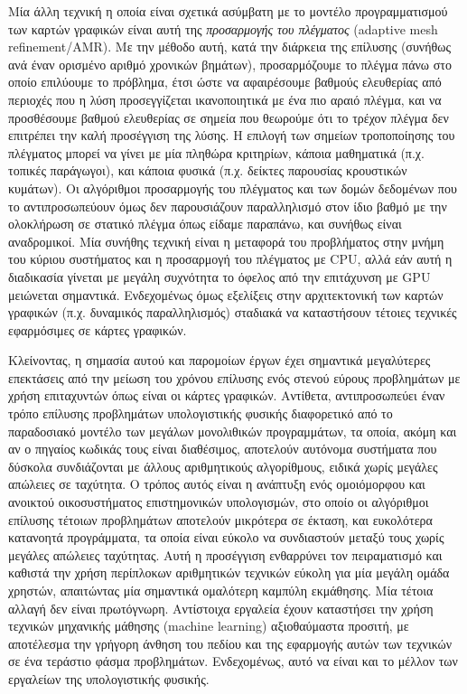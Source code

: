 Μία άλλη τεχνική η οποία είναι σχετικά ασύμβατη με το μοντέλο προγραμματισμού των καρτών γραφικών είναι αυτή της \emph{προσαρμογής του πλέγματος} (adaptive mesh refinement/AMR).
Με την μέθοδο αυτή, κατά την διάρκεια της επίλυσης (συνήθως ανά έναν ορισμένο αριθμό χρονικών βημάτων), προσαρμόζουμε το πλέγμα πάνω στο οποίο επιλύουμε το πρόβλημα, έτσι ώστε να αφαιρέσουμε βαθμούς ελευθερίας από περιοχές που η λύση προσεγγίζεται ικανοποιητικά με ένα πιο αραιό πλέγμα, και να προσθέσουμε βαθμού ελευθερίας σε σημεία που θεωρούμε ότι το τρέχον πλέγμα δεν επιτρέπει την καλή προσέγγιση της λύσης.
Η επιλογή των σημείων τροποποίησης του πλέγματος μπορεί να γίνει με μία πληθώρα κριτηρίων, κάποια μαθηματικά (π.χ. τοπικές παράγωγοι), και κάποια φυσικά (π.χ. δείκτες παρουσίας κρουστικών κυμάτων).
Οι αλγόριθμοι προσαρμογής του πλέγματος και των δομών δεδομένων που το αντιπροσωπεύουν όμως δεν παρουσιάζουν παραλληλισμό στον ίδιο βαθμό με την ολοκλήρωση σε στατικό πλέγμα όπως είδαμε παραπάνω, και συνήθως είναι αναδρομικοί.
Μία συνήθης τεχνική είναι η μεταφορά του προβλήματος στην μνήμη του κύριου συστήματος και η προσαρμογή του πλέγματος με CPU, αλλά εάν αυτή η διαδικασία γίνεται με μεγάλη συχνότητα το όφελος από την επιτάχυνση με GPU μειώνεται σημαντικά.
Ενδεχομένως όμως εξελίξεις στην αρχιτεκτονική των καρτών γραφικών (π.χ. δυναμικός παραλληλισμός) σταδιακά να καταστήσουν τέτοιες τεχνικές εφαρμόσιμες σε κάρτες γραφικών.

Κλείνοντας, η σημασία αυτού και παρομοίων έργων έχει σημαντικά μεγαλύτερες επεκτάσεις από την μείωση του χρόνου επίλυσης ενός στενού εύρους προβλημάτων με χρήση επιταχυντών όπως είναι οι κάρτες γραφικών.
Αντίθετα, αντιπροσωπεύει έναν τρόπο επίλυσης προβλημάτων υπολογιστικής φυσικής διαφορετικό από το παραδοσιακό μοντέλο των μεγάλων μονολιθικών προγραμμάτων, τα οποία, ακόμη και αν ο πηγαίος κωδικάς τους είναι διαθέσιμος, αποτελούν αυτόνομα συστήματα που δύσκολα συνδιάζονται με άλλους αριθμητικούς αλγορίθμους, ειδικά χωρίς μεγάλες απώλειες σε ταχύτητα.
Ο τρόπος αυτός είναι η ανάπτυξη ενός ομοιόμορφου και ανοικτού οικοσυστήματος επιστημονικών υπολογισμών, στο οποίο οι αλγόριθμοι επίλυσης τέτοιων προβλημάτων αποτελούν μικρότερα σε έκταση, και ευκολότερα κατανοητά προγράμματα, τα οποία είναι εύκολο να συνδιαστούν μεταξύ τους χωρίς μεγάλες απώλειες ταχύτητας.
Αυτή η προσέγγιση ενθαρρύνει τον πειραματισμό και καθιστά την χρήση περίπλοκων αριθμητικών τεχνικών εύκολη για μία μεγάλη ομάδα χρηστών, απαιτώντας μία σημαντικά ομαλότερη καμπύλη εκμάθησης.
Μία τέτοια αλλαγή δεν είναι πρωτόγνωρη.
Αντίστοιχα εργαλεία έχουν καταστήσει την χρήση τεχνικών μηχανικής μάθησης (machine learning) αξιοθαύμαστα προσιτή, με αποτέλεσμα την γρήγορη άνθηση του πεδίου και της εφαρμογής αυτών των τεχνικών σε ένα τεράστιο φάσμα προβλημάτων.
Ενδεχομένως, αυτό να είναι και το μέλλον των εργαλείων της υπολογιστικής φυσικής.


